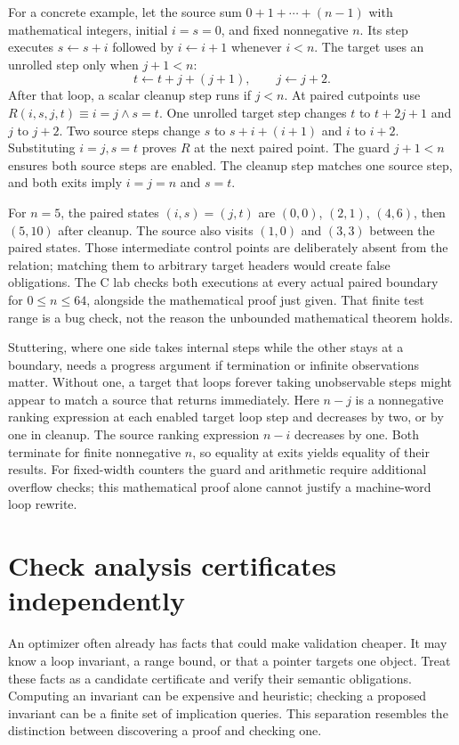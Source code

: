 For a concrete example, let the source sum $0+1+\cdots+(n-1)$ with mathematical integers, initial $i=s=0$, and fixed nonnegative $n$.
Its step executes $s\gets s+i$ followed by $i\gets i+1$ whenever $i<n$.
The target uses an unrolled step only when $j+1<n$:
\[
  t\gets t+j+(j+1),\qquad j\gets j+2.
\]
After that loop, a scalar cleanup step runs if $j<n$.
At paired cutpoints use $R(i,s,j,t)\equiv i=j\land s=t$.
One unrolled target step changes $t$ to $t+2j+1$ and $j$ to $j+2$.
Two source steps change $s$ to $s+i+(i+1)$ and $i$ to $i+2$.
Substituting $i=j,s=t$ proves $R$ at the next paired point.
The guard $j+1<n$ ensures both source steps are enabled.
The cleanup step matches one source step, and both exits imply $i=j=n$ and $s=t$.

For $n=5$, the paired states $(i,s)=(j,t)$ are $(0,0)$, $(2,1)$, $(4,6)$, then $(5,10)$ after cleanup.
The source also visits $(1,0)$ and $(3,3)$ between the paired states.
Those intermediate control points are deliberately absent from the relation; matching them to arbitrary target headers would create false obligations.
The C lab checks both executions at every actual paired boundary for $0\leq n\leq64$, alongside the mathematical proof just given.
That finite test range is a bug check, not the reason the unbounded mathematical theorem holds.

Stuttering, where one side takes internal steps while the other stays at a boundary, needs a progress argument if termination or infinite observations matter.
Without one, a target that loops forever taking unobservable steps might appear to match a source that returns immediately.
Here $n-j$ is a nonnegative ranking expression at each enabled target loop step and decreases by two, or by one in cleanup.
The source ranking expression $n-i$ decreases by one.
Both terminate for finite nonnegative $n$, so equality at exits yields equality of their results.
For fixed-width counters the guard and arithmetic require additional overflow checks; this mathematical proof alone cannot justify a machine-word loop rewrite.

\section{Check analysis certificates independently}
\label{sec:ch47-certificates}

An optimizer often already has facts that could make validation cheaper.
It may know a loop invariant, a range bound, or that a pointer targets one object.
Treat these facts as a candidate certificate and verify their semantic obligations.
Computing an invariant can be expensive and heuristic; checking a proposed invariant can be a finite set of implication queries.
This separation resembles the distinction between discovering a proof and checking one.

